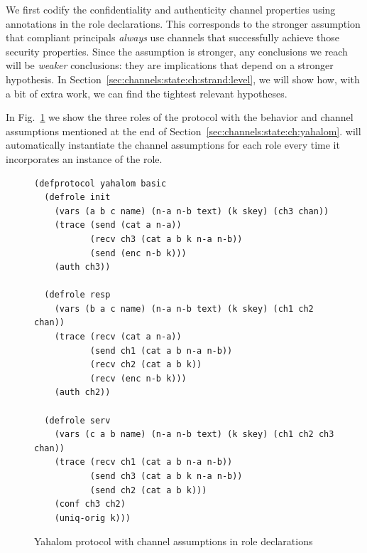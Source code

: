 We first codify the confidentiality and authenticity channel
properties using annotations in the role declarations.  This
corresponds to the stronger assumption that compliant principals
\emph{always} use channels that successfully achieve those security
properties.  Since the assumption is stronger, any conclusions we
reach will be \emph{weaker} conclusions: they are implications that
depend on a stronger hypothesis.  In
Section~\ref{sec:channels:state:ch:strand:level}, we will show how,
with a bit of extra work, we can find the tightest relevant
hypotheses.

In Fig.~\ref{fig:yahalom:ch:role} we show the three roles of the
protocol with the behavior and channel assumptions mentioned at the
end of Section~\ref{sec:channels:state:ch:yahalom}.  {\cpsa} will
automatically instantiate the channel assumptions for each role every
time it incorporates an instance of the role.
%
\begin{figure}\small
%
\begin{verbatim}(defprotocol yahalom basic
  (defrole init
    (vars (a b c name) (n-a n-b text) (k skey) (ch3 chan))
    (trace (send (cat a n-a))
           (recv ch3 (cat a b k n-a n-b))
           (send (enc n-b k)))
    (auth ch3))

  (defrole resp
    (vars (b a c name) (n-a n-b text) (k skey) (ch1 ch2 chan))
    (trace (recv (cat a n-a))
           (send ch1 (cat a b n-a n-b))
           (recv ch2 (cat a b k))
           (recv (enc n-b k)))
    (auth ch2))

  (defrole serv
    (vars (c a b name) (n-a n-b text) (k skey) (ch1 ch2 ch3 chan))
    (trace (recv ch1 (cat a b n-a n-b))
           (send ch3 (cat a b k n-a n-b))
           (send ch2 (cat a b k)))
    (conf ch3 ch2)
    (uniq-orig k)))\end{verbatim}
  \caption[Yahalom (role decls.)]{Yahalom protocol with channel
    assumptions in role declarations}
  \label{fig:yahalom:ch:role}
\end{figure}

